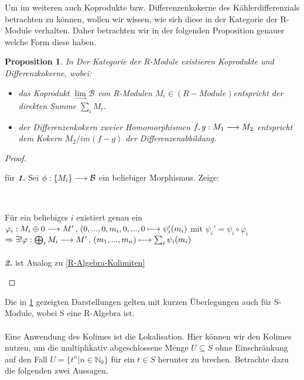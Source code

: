 \documentclass[10pt,a4paper]{report}
\newcounter{Aussage}[chapter]
\newtheorem{prop}[Aussage]{Proposition}
\newcommand{\functionfront}[3]{\nolinebreak{#1:#2 \longrightarrow #3}}
\newcommand{\function}[5]{\nolinebreak{#1:#2 \longrightarrow #3 \, , \, #4 \longmapsto #5}}
\newcommand{\colimes}[0]{\lim\limits_{ \longrightarrow }}
\newcommand{\immage}[1]{im(#1)}
\begin{document}
Um im weiteren auch Koprodukte bzw. Differenzenkokerne des Kählerdifferenzials betrachten zu können, wollen wir wissen, wie sich diese in der Kategorie der R-Module verhalten. Daher betrachten wir in der folgenden Proposition genauer welche Form diese haben.
\begin{prop}\label{R-Modul-Kolimiten}
In Der Kategorie der R-Module  existieren Koprodukte und Differenzkokerne, wobei:
\begin{itemize}
\item[\textbf{1.}] das Koprodukt $\colimes \mathcal{B}$ von R-Modulen $M_i \in (R-Module)$entspricht der direkten Summe $\sum_i M_i$.
\item[\textbf{2.}] der Differenzenkokern zweier Homomorphismen $\functionfront{f,g}{M_1}{M_2}$ entspricht dem Kokern $M_2/\immage{f-g}$ der Differenzenabbildung.
\end{itemize}
\end{prop}
\begin{proof}
\begin{itemize}

für \textit{\textbf{1.}} Sei $\functionfront{\phi}{\lbrace M_i \rbrace}{\mathcal{B}}$ ein beliebiger Morphismus. Zeige: \\
\begin{center}
\\
\end{center}
Für ein beliebiges $i$ existiert genau ein $\function{\varphi_i}{M_i \oplus 0}{M'}{(0,...,0,m_i,0,...,0}{\psi_i '(m_i)}$
 mit $\psi_i ' = \psi_i \circ \varphi_i$\\
$\Rightarrow  \exists ! \function{\varphi}{\bigoplus_i M_i}{M'}{(m_1,...,m_n)}{\sum_i \psi_i(m_i)}$\\
\ \\
\textit{\textbf{2.}} ist Analog zu \cref{R-Algebra-Kolimiten}
\end{itemize}
\end{proof}
Die in \cref{R-Modul-Kolimiten} gezeigten Darstellungen gelten mit kurzen Überlegungen auch für S-Module, wobei S eine R-Algebra ist.\\
\ \\
Eine Anwendung des Kolimes ist die Lokalisation. Hier können wir den Kolimes nutzen, um die multiplikativ abgeschlossene Menge $U \subseteq S$ ohne Einschränkung auf den Fall $U = \lbrace t^n \vert n \in \mathbb{N}_0 \rbrace$ für ein $t \in S$ herunter zu brechen. Betrachte dazu die folgenden zwei Aussagen.\\
\end{document}
